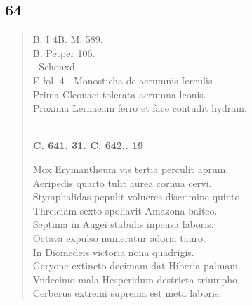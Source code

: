 \documentclass[11pt, a4paper]{report}
\begin{document}
            \subsection*{64}
      \begin{verse}
      B. I 4B. M. 589. \\ B. Petper 106. \\ . Schonxd \\ E fol. 4 . Monosticha de aerumnis Ierculis \\ Prima Cleonaei tolerata aerumna leonis. \\ Proxima Lernaeam ferro et face contudit hydram. \\ 
        ﻿\pagebreak 
    \begin{center} \textbf{C. 641, 31. C. 642,. 19} \end{center} \marginpar{[108]} Mox Erymantheum vis tertia perculit aprum. \\ Aeripedis quarto tulit aurea cornua cervi. \\ Stymphalidas pepulit volucres discrimine quinto. \\ Threiciam sexto spoliavit Amazona balteo. \\ Septima in Augei stabulis inpensa laboris. \\ Octava expulso numeratur adoria tauro. \\ In Diomedeis victoria nona quadrigis. \\ Geryone extincto decimam dat Hiberia palmam. \\ Vndecimo mala Hesperidum destricta triumpho. \\ Cerberus extremi suprema est meta laboris. \\ 
      \end{verse}
  
\end{document}
